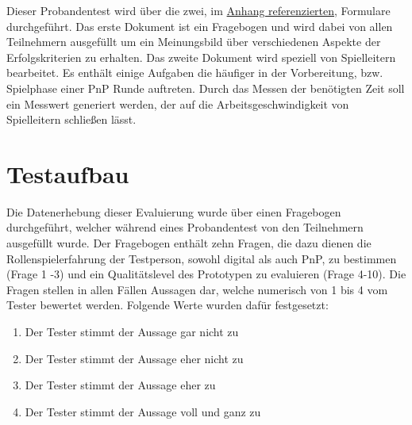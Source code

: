 Dieser Probandentest wird über die zwei, im \hyperlink{AppendixFragebogenA.1}{Anhang referenzierten}, Formulare durchgeführt. Das erste Dokument ist ein Fragebogen und wird dabei von allen Teilnehmern ausgefüllt um ein Meinungsbild über verschiedenen Aspekte der Erfolgskriterien zu erhalten. Das zweite Dokument wird speziell von Spielleitern bearbeitet. Es enthält einige Aufgaben die häufiger in der Vorbereitung, bzw. Spielphase einer PnP Runde auftreten. Durch das Messen der benötigten Zeit soll ein Messwert generiert werden, der auf die Arbeitsgeschwindigkeit von Spielleitern schließen lässt.
  



\section{Testaufbau}
\label{sec:Testaufbau}
Die Datenerhebung dieser Evaluierung wurde über einen Fragebogen durchgeführt, welcher während eines Probandentest von den Teilnehmern ausgefüllt wurde. Der Fragebogen enthält zehn Fragen, die dazu dienen die Rollenspielerfahrung der Testperson, sowohl digital als auch PnP, zu bestimmen (Frage 1 -3) und ein Qualitätslevel des Prototypen zu evaluieren (Frage 4-10). Die Fragen stellen in allen Fällen Aussagen dar, welche numerisch von 1 bis 4 vom Tester bewertet werden. Folgende Werte wurden dafür festgesetzt:

\begin{enumerate}
	\item Der Tester stimmt der Aussage gar nicht zu
	\item Der Tester stimmt der Aussage eher nicht zu
	\item Der Tester stimmt der Aussage eher zu
	\item Der Tester stimmt der Aussage voll und ganz zu
\end{enumerate}

